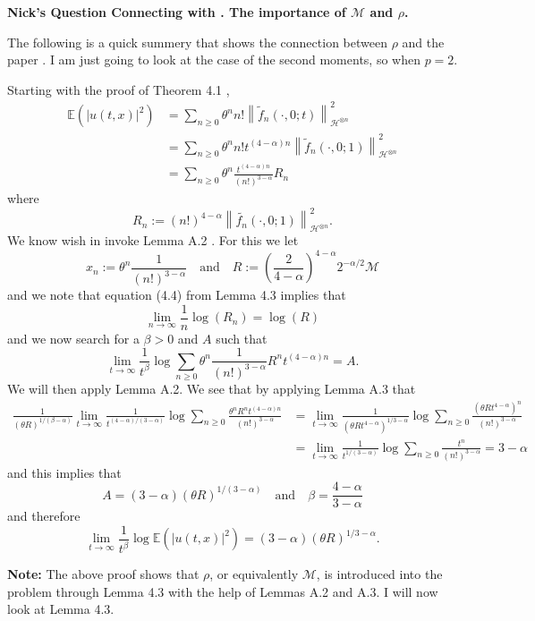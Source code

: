 \documentclass[a4paper,11pt]{article}
\numberwithin{equation}{section}
\theoremstyle{plain}
\theoremstyle{definition}
\newcommand{\Norm}[1]{\left\|  #1   \right\|}
\newcounter{NQ}
\newenvironment{NickQuestion}[1][] %
{\refstepcounter{NQ}
	\begin{mdframed}[backgroundcolor=lightgray]\textbf{Nick's Question \theNQ \: #1~~}~~~\noindent}%
	{\end{mdframed}}
\numberwithin{NQ}{section}
\numberwithin{LQ}{section}
\numberwithin{ZQ}{section}
\begin{document}
\begin{NickQuestion}[Connecting \cite{BCC21} with \cite{BCR09}. The importance of $\mathcal{M}$ and $\rho$.]

The following is a quick summery that shows the connection between $\rho$ and the paper \cite{BCC21}. I am just going to look at the case of the second moments, so when $p=2$.

Starting with the proof of Theorem 4.1 \cite{BCC21},
	\begin{align*}
		\mathbb{E}\left( |u(t,x)|^2 \right) &= \sum_{n \ge 0} \theta^n n! \Norm{\tilde{f}_n(\cdot,0;t)}_{\mathcal{H}^{\otimes n}}^2
\\ & = \sum_{n \ge 0} \theta^n n! t^{(4-\alpha)n} \Norm{\tilde{f}_n(\cdot,0;1)}_{\mathcal{H}^{\otimes n}}^2
\\ & = \sum_{n \ge 0} \theta^n \frac{t^{(4-\alpha)n}}{(n!)^{3-\alpha}}R_n
	\end{align*}
where
	\[
		R_n := (n!)^{4-\alpha}\Norm{\tilde{f_n}(\cdot,0;1)}_{\mathcal{H}^{\otimes n}}^2.
	\]
We know wish in invoke Lemma A.2 \cite{BCC21}. For this we let
	\[
		x_n := \theta^n \frac{1}{(n!)^{3-\alpha}} \quad \text{and} \quad R:= \left( \frac{2}{4- \alpha} \right)^{4-\alpha} 2^{-\alpha /2} \mathcal{M}
	\]
and we note that equation (4.4) from Lemma 4.3 \cite{BCC21} implies that
	\[
		\lim_{n \to \infty} \frac{1}{n} \log(R_n) = \log(R)
	\]
and we now search for a $\beta > 0$ and $A$ such that
	\[
		\lim_{t \to \infty} \frac{1}{t^\beta} \log \sum_{n \ge 0} \theta^n \frac{1}{(n!)^{3-\alpha}}R^nt^{(4-\alpha)n} =A.
	\]
We will then apply Lemma A.2. We see that by applying Lemma A.3 \cite{BCC21} that
	\begin{align*}
		\frac{1}{(\theta R)^{1/(\beta-\alpha)}} \lim_{t \to \infty} \frac{1}{t^{(4- \alpha)/(3-\alpha)}} \log \sum_{n \ge 0} \frac{ \theta^n R^n t^{(4-\alpha)n} }{ (n!)^{3-\alpha} } &= \lim_{t\to \infty} \frac{1}{ (\theta R t^{4-\alpha})^{1/{3-\alpha}} } \log \sum_{n \ge 0} \frac{ (\theta R t^{4-\alpha})^n }{ (n!)^{3-\alpha} }
\\ & = \lim_{t \to \infty} \frac{1}{t^{1/(3-\alpha)}} \log \sum_{n \ge 0} \frac{t^n}{(n!)^{3-\alpha}} = 3-\alpha
	\end{align*}
and this implies that
	\[
		A= (3-\alpha)(\theta R)^{1/(3-\alpha)} \quad \text{and} \quad \beta = \frac{4-\alpha}{3-\alpha}
	\]
and therefore
	\[
		\lim_{t \to \infty} \frac{1}{t^\beta} \log \mathbb{E}\left( |u(t,x)|^2\right) = (3-\alpha)(\theta R)^{1/{3-\alpha}}.
	\]

\textbf{Note:} The above proof shows that $\rho$, or equivalently $\mathcal{M}$, is introduced into the problem through Lemma 4.3 \cite{BCC21} with the help of Lemmas A.2 and A.3. I will now look at Lemma 4.3.


\end{NickQuestion}
\end{document}
